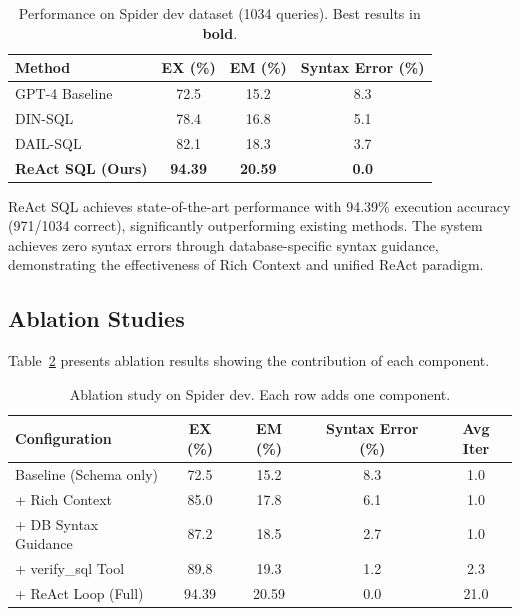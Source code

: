 \begin{table}[h]
\centering
\caption{Performance on Spider dev dataset (1034 queries). Best results in \textbf{bold}.}
\label{tab:main_results}
\begin{tabular}{lccc}
\toprule
\textbf{Method} & \textbf{EX (\%)} & \textbf{EM (\%)} & \textbf{Syntax Error (\%)} \\
\midrule
GPT-4 Baseline & 72.5 & 15.2 & 8.3 \\
DIN-SQL & 78.4 & 16.8 & 5.1 \\
DAIL-SQL & 82.1 & 18.3 & 3.7 \\
\midrule
\textbf{ReAct SQL (Ours)} & \textbf{94.39} & \textbf{20.59} & \textbf{0.0} \\
\bottomrule
\end{tabular}
\end{table}

ReAct SQL achieves state-of-the-art performance with 94.39\% execution accuracy (971/1034 correct), significantly outperforming existing methods. The system achieves zero syntax errors through database-specific syntax guidance, demonstrating the effectiveness of Rich Context and unified ReAct paradigm.

\subsection{Ablation Studies}

Table~\ref{tab:ablation} presents ablation results showing the contribution of each component.

\begin{table}[h]
\centering
\caption{Ablation study on Spider dev. Each row adds one component.}
\label{tab:ablation}
\begin{tabular}{lcccc}
\toprule
\textbf{Configuration} & \textbf{EX (\%)} & \textbf{EM (\%)} & \textbf{Syntax Error (\%)} & \textbf{Avg Iter} \\
\midrule
Baseline (Schema only) & 72.5 & 15.2 & 8.3 & 1.0 \\
+ Rich Context & 85.0 & 17.8 & 6.1 & 1.0 \\
+ DB Syntax Guidance & 87.2 & 18.5 & 2.7 & 1.0 \\
+ verify\_sql Tool & 89.8 & 19.3 & 1.2 & 2.3 \\
+ ReAct Loop (Full) & 94.39 & 20.59 & 0.0 & 21.0 \\
\bottomrule
\end{tabular}
\end{table}

